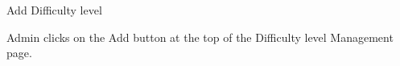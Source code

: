 
\begin{uc}{Add Difficulty level}

    
    \begin{uc-trig}
        Admin clicks on the Add button at the top of the Difficulty level Management
        page.
    \end{uc-trig}
\end{uc}

